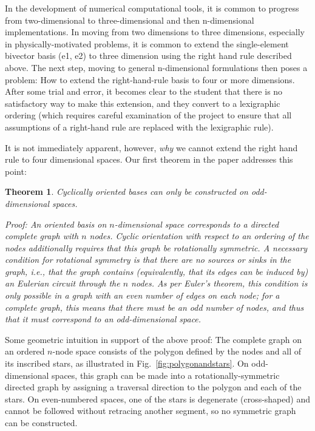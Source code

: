 \documentclass[11pt]{article}
\newtheorem{theorem}{Theorem}[section]
\begin{document}
In the development of numerical computational tools, it is common to progress from two-dimensional to three-dimensional and then n-dimensional implementations. In moving from two dimensions to three dimensions, especially in physically-motivated problems, it is common to extend the single-element bivector basis (e1, e2) to three dimension using the right hand rule described above. The next step, moving to general n-dimensional formulations then poses a problem: How to extend the right-hand-rule basis to four or more dimensions. After some trial and error, it becomes clear to the student that there is no satisfactory way to make this extension, and they convert to a lexigraphic ordering (which requires careful examination of the project to ensure that all assumptions of a right-hand rule are replaced with the lexigraphic rule).

It is not immediately apparent, however, \emph{why} we cannot extend the right hand rule to four dimensional spaces. Our first theorem in the paper addresses this point:



\begin{theorem}{Cyclically oriented bases can only be constructed on odd-dimensional spaces.}

Proof: An oriented basis on $n$-dimensional space corresponds to a directed complete graph with $n$ nodes. Cyclic orientation with respect to an ordering of the nodes additionally requires that this graph be rotationally symmetric. A necessary condition for rotational symmetry is that there are no sources or sinks in the graph, i.e., that the graph contains (equivalently, that its edges can be induced by) an Eulerian circuit through the $n$ nodes. As per Euler’s theorem, this condition is only possible in a graph with an even number of edges on each node; for a complete graph, this means that there must be an odd number of nodes, and thus that it must correspond to an odd-dimensional space.

\end{theorem}


Some geometric intuition in support of the above proof: The complete graph on an ordered $n$-node space consists of the polygon defined by the nodes and all of its inscribed stars, as illustrated in Fig.~\ref{fig:polygonandstars}. On odd-dimensional spaces, this graph can be made into a rotationally-symmetric directed graph by assigning a traversal direction to the polygon and each of the stars. On even-numbered spaces, one of the stars is degenerate (cross-shaped) and cannot be followed without retracing another segment, so no symmetric graph can be constructed.
\end{document}
